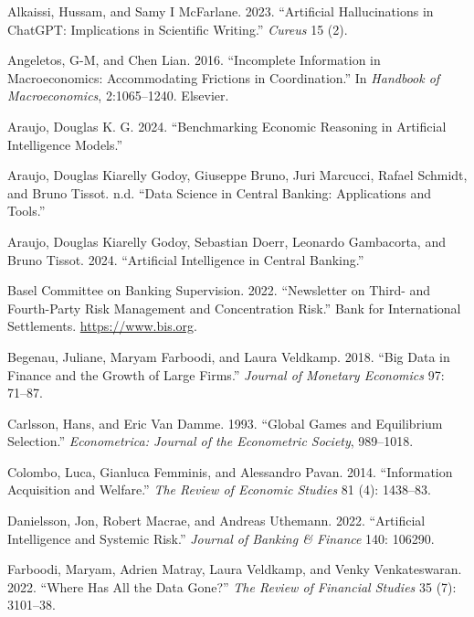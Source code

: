 \documentclass[
]{article}
\newlength{\cslhangindent}
\newenvironment{CSLReferences}[2] %
 {\begin{list}{}{%
  \setlength{\itemindent}{0pt}
  \setlength{\leftmargin}{0pt}
  \setlength{\parsep}{0pt}
  \ifodd #1
   \setlength{\leftmargin}{\cslhangindent}
   \setlength{\itemindent}{-1\cslhangindent}
  \fi
  \setlength{\itemsep}{#2\baselineskip}}}
 {\end{list}}
\theoremstyle{plain}
\theoremstyle{definition}
\theoremstyle{remark}
\begin{document}
\label{refs}
\begin{CSLReferences}{1}{0}
Alkaissi, Hussam, and Samy I McFarlane. 2023. {``Artificial
Hallucinations in ChatGPT: Implications in Scientific Writing.''}
\emph{Cureus} 15 (2).

Angeletos, G-M, and Chen Lian. 2016. {``Incomplete Information in
Macroeconomics: Accommodating Frictions in Coordination.''} In
\emph{Handbook of Macroeconomics}, 2:1065--1240. Elsevier.

Araujo, Douglas K. G. 2024. {``Benchmarking Economic Reasoning in
Artificial Intelligence Models.''}

Araujo, Douglas Kiarelly Godoy, Giuseppe Bruno, Juri Marcucci, Rafael
Schmidt, and Bruno Tissot. n.d. {``Data Science in Central Banking:
Applications and Tools.''}

Araujo, Douglas Kiarelly Godoy, Sebastian Doerr, Leonardo Gambacorta,
and Bruno Tissot. 2024. {``Artificial Intelligence in Central
Banking.''}

Basel Committee on Banking Supervision. 2022. {``{Newsletter on Third-
and Fourth-Party Risk Management and Concentration Risk}.''} {Bank for
International Settlements}. \url{https://www.bis.org}.

Begenau, Juliane, Maryam Farboodi, and Laura Veldkamp. 2018. {``Big Data
in Finance and the Growth of Large Firms.''} \emph{Journal of Monetary
Economics} 97: 71--87.

Carlsson, Hans, and Eric Van Damme. 1993. {``Global Games and
Equilibrium Selection.''} \emph{Econometrica: Journal of the Econometric
Society}, 989--1018.

Colombo, Luca, Gianluca Femminis, and Alessandro Pavan. 2014.
{``Information Acquisition and Welfare.''} \emph{The Review of Economic
Studies} 81 (4): 1438--83.

Danielsson, Jon, Robert Macrae, and Andreas Uthemann. 2022.
{``Artificial Intelligence and Systemic Risk.''} \emph{Journal of
Banking \& Finance} 140: 106290.

Farboodi, Maryam, Adrien Matray, Laura Veldkamp, and Venky
Venkateswaran. 2022. {``Where Has All the Data Gone?''} \emph{The Review
of Financial Studies} 35 (7): 3101--38.


\end{CSLReferences}
\end{document}
